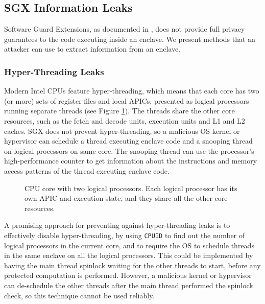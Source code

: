 \subsection{SGX Information Leaks}
\label{sec:sgx_leaks}

Software Guard Extensions, as documented in \cite{intel2013sgxmanual}, does not
provide full privacy guarantees to the code executing inside an enclave. We
present methods that an attacker can use to extract information from an
enclave.

\subsubsection{Hyper-Threading Leaks}

Modern Intel CPUs feature hyper-threading, which means that each core has two
(or more) sets of register files and local APICs, presented as logical
processors running separate threads (see Figure \ref{fig:cpu_core}). The
threads share the other core resources, such as the fetch and decode units,
execution units and L1 and L2 caches. SGX does not prevent hyper-threading, so
a malicious OS kernel or hypervisor can schedule a thread executing enclave
code and a snooping thread on logical processors on same core. The snooping
thread can use the processor's high-performance counter
\cite{petters1999making} to get information about the instructions and memory
access patterns of the thread executing enclave code.

\begin{figure}[hbtp]
  \caption{
    CPU core with two logical processors. Each logical processor has its own
    APIC and execution state, and they share all the other core resources.
  }
  \label{fig:cpu_core}
\end{figure}

A promising approach for preventing against hyper-threading leaks is to
effectively disable hyper-threading, by using \texttt{CPUID} to find out the
number of logical processors in the current core, and to require the OS to
schedule threads in the same enclave on all the logical processors. This could
be implemented by having the main thread spinlock waiting for the other threads
to start, before any protected computation is performed. However, a malicious
kernel or hypervisor can de-schedule the other threads after the main thread
performed the spinlock check, so this technique cannot be used reliably.

